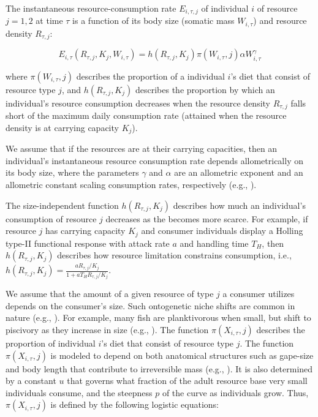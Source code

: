 \documentclass[11pt]{article}
\begin{document}
\begin{linenumbers}
The instantaneous resource-consumption rate $E_{i,{\tau},j}$ of individual $i$ of resource $j = 1,2$ at time $\tau$ is a function of its body size (somatic mass $W_{i,\tau}$) and resource density $R_{\tau,j}$:
\begin{linenomath}
\begin{equation}
E_{i,\tau} (R_{\tau,j}, K_j, W_{i,\tau}) =  h(R_{\tau,j},K_j) \pi(W_{i,\tau}, j) \alpha W_{i,\tau}^{\gamma} 
\end{equation}
\end{linenomath}
where $\pi(W_{i,\tau}, j)$ describes the proportion of a individual $i$'s diet that consist of resource type $j$, and $h(R_{\tau,j}, K_j)$ describes the proportion by which an individual's resource consumption decreases when the resource density $R_{\tau,j}$ falls short of the maximum daily consumption rate (attained when the resource density is at carrying capacity $K_j$). 

We assume that if the resources are at their carrying capacities, then an individual's instantaneous resource consumption rate depends allometrically on its body size, where the parameters $\gamma$ and $\alpha$ are an allometric exponent and an allometric constant scaling consumption rates, respectively (e.g., \citealt{west01}). 

The size-independent function $h(R_{\tau,j},K_j)$ describes how much an individual's consumption of resource $j$ decreases as the becomes more scarce. For example, if resource $j$ has carrying capacity $K_j$ and consumer individuals display a Holling type-II functional response with attack rate $a$ and handling time $T_H$, then $h(R_{\tau,j},K_j)$ describes how resource limitation constrains consumption, i.e., $h(R_{\tau,j},K_j) =\frac{a R_{\tau,j}/K_j}{1 + a T_H R_{\tau,j}/K_j}$. 

We assume that the amount of a given resource of type $j$ a consumer utilizes depends on the consumer's size. Such ontogenetic niche shifts are common in nature (e.g., \citealt{werner84}). For example, many fish are planktivorous when small, but shift to piscivory as they increase in size (e.g., \citealt{claessen02}). The function $\pi(X_{i,\tau}, j)$ describes the proportion of individual $i$'s diet that consist of resource type $j$. The function $\pi(X_{i,\tau},j)$ is modeled to depend on both anatomical structures such as gape-size and body length that contribute to irreversible mass  (e.g., \citealt{werner84}). It is also determined by a constant $u$ that governs what fraction of the adult resource base very small individuals consume, and the steepness $p$ of the curve as individuals grow. Thus, $\pi(X_{i,\tau},j)$ is defined by the following logistic equations:


\end{linenumbers}
\end{document}
